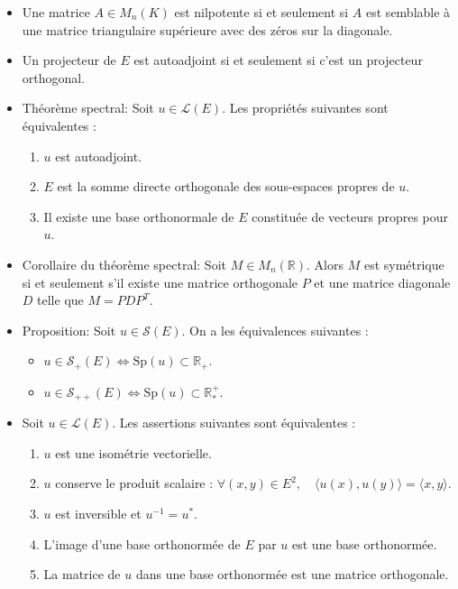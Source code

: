 \documentclass{article}
\begin{document}
\begin{itemize}[label=$\ast$]
\item Une matrice $A \in M_n(K)$ est nilpotente si et seulement si $A$ est semblable à une matrice triangulaire supérieure avec des zéros sur la diagonale.

\item Un projecteur de $E$ est autoadjoint si et seulement si c'est un projecteur orthogonal.


\item Théorème spectral: Soit $u \in \mathcal{L}(E)$. Les propriétés suivantes sont équivalentes :
\begin{enumerate}
    \item $u$ est autoadjoint.
    \item $E$ est la somme directe orthogonale des sous-espaces propres de $u$.
    \item Il existe une base orthonormale de $E$ constituée de vecteurs propres pour $u$.
\end{enumerate}

\item Corollaire du théorème spectral: Soit $M \in M_n(\mathbb{R})$. Alors $M$ est symétrique si et seulement s'il existe une matrice orthogonale $P$ et une matrice diagonale $D$ telle que $M = PDP^T$.

\item Proposition: Soit $u \in \mathcal{S}(E)$. On a les équivalences suivantes :
\begin{itemize}
    \item $u \in \mathcal{S}_+(E) \iff \text{Sp}(u) \subset \mathbb{R}_+$.
    \item $u \in \mathcal{S}_{++}(E) \iff \text{Sp}(u) \subset \mathbb{R}_*^+$.
\end{itemize}

\item 
Soit $u \in \mathcal{L}(E)$. Les assertions suivantes sont équivalentes :
\begin{enumerate}
    \item $u$ est une isométrie vectorielle.
    \item $u$ conserve le produit scalaire : $\forall (x, y) \in E^2, \quad \langle u(x), u(y) \rangle = \langle x, y \rangle$.
    \item $u$ est inversible et $u^{-1} = u^*$.
    \item L'image d'une base orthonormée de $E$ par $u$ est une base orthonormée.
    \item La matrice de $u$ dans une base orthonormée est une matrice orthogonale.
\end{enumerate}


\end{itemize}
\end{document}
